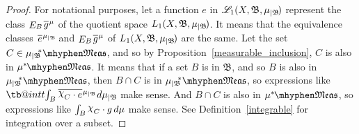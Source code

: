 \documentclass[
twoside=true,
paper=letter,
fontsize=9pt,
pagesize=auto,
leqno,
openany,
headsepline,
overfullrule,
]{scrbook}
\makeatletter
\theoremstyle{plain}
\theoremstyle{plain}
\theoremstyle{definition}
\theoremstyle{bfnoteitalic}
\theoremstyle{bfnoteroman}
\newcommand{\sigalg}[1]{\mathfrak{#1}}
\newcommand{\cali}[1]{\mathscr{#1}}
\newcommand{\kondexpsub}[2]
{\mathop{E}\nolimits_{#2}\hspace{-1pt}#1}
\newcommand{\charfunction}[1]{{\raisebox{2pt}{$\chi$}}_{#1}}
\newcommand{\restrictedto}[1]{_{\lvert#1}\kern-1.5pt}
\newcommand{\meets}{\cap}
\newcommand{\sigmaalgebraii}{\sigalg{B}}
\newcommand{\measurable}[1]{{#1}\mhyphen\mathfrak{Meas}}
\newcommand{\kernast}{\ast\kern-1pt}
\newcommand{\Psubstar}[1]{\measure\restrictedto{#1}\kern-2pt^*}
\newcommand{\functionii}{g}
\newcommand{\measurespace}{X}
\newcommand{\measure}{\mu}
\newcommand*\xbar[1]{%
   \hbox{%
     \vbox{%
       \hrule height 0.4pt %
       \kern0.4ex%
       \hbox{%
         \ensuremath{#1}%
       }%
     }%
   }%
}
\newcommand\tint{\mathop{\mathpalette\tb@int{t}}\!\int}
\newcommand\tb@int[2]{%
  \sbox\z@{$\m@th#1\int$}%
  \if#2t%
    \rlap{\hbox to\wd\z@{%
      \hfil
      \vrule width .35em height \dimexpr\ht\z@+1.4pt\relax depth -\dimexpr\ht\z@+1pt\relax
      \kern.05em %
    }}
  \else
    \rlap{\hbox to\wd\z@{%
      \vrule width .35em height -\dimexpr\dp\z@+1pt\relax depth \dimexpr\dp\z@+1.4pt\relax
      \hfil
    }}
  \fi
}
\newcommand{\lebclass}[1]{\hspace{.5pt}\xbar{#1}\hspace{0.5pt}}
\newcommand{\ellclass}[2]{\lebclass{#1}^{#2}}
\newcommand{\inducedint}{\tint}
\makeatother
\begin{document}
\begin{proof}
For notational purposes, let a function
$e$
in
$\cali{L}_1(\measurespace, \sigmaalgebraii,\measure\restrictedto{\sigmaalgebraii})$
represent the class 
$\kondexpsub{\ellclass{\functionii}{\measure}}{B}$
of the quotient space
$L_1(\measurespace, \sigmaalgebraii,\measure\restrictedto{\sigmaalgebraii})$.
It means that the equivalence classes
$\ellclass{e}{\measure\restrictedto{\sigmaalgebraii}}$
and
$\kondexpsub{\ellclass{\functionii}{\measure}}{B}$ of
$L_1(\measurespace, \sigmaalgebraii,\measure\restrictedto{\sigmaalgebraii})$
are the same.
Let the set
$C\in\measurable{\Psubstar{\sigmaalgebraii}}$,
and so by Proposition~\ref{measurable_inclusion}, $C$ is also in
$\measurable{\measure^\kernast}$.
It means that if a set $B$ is in
$\sigmaalgebraii$, and so $B$ is also in $\measurable{\Psubstar{\sigmaalgebraii}}$,
then
$B\meets C$ is in $\measurable{\Psubstar{\sigmaalgebraii}}$,
so expressions like
$\inducedint_B \ellclass{\charfunction{C}\cdot e}{\measure\restrictedto{\sigmaalgebraii}}\, d\measure\restrictedto{\sigmaalgebraii}$ make sense. And
$B\meets C$ is also in $\measurable{\measure^\kernast}$, so expressions like
$\int_B\charfunction{C} \cdot \functionii \, d\measure$ make sense.
See Definition~\ref{integrable} for integration over a subset.


\end{proof}
\end{document}

